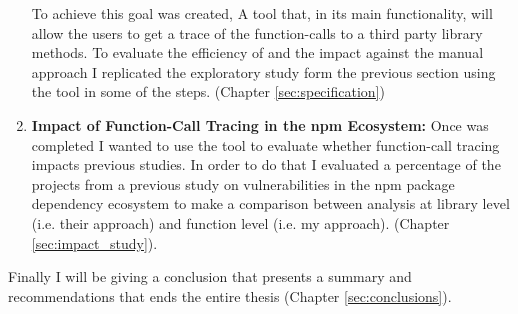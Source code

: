 \begin{enumerate}
    To achieve this goal \tool[] was created,
    A tool that, in its main functionality, will allow the users to get a trace of the function-calls to a third party library methods.
    To evaluate the efficiency of \tool[] and the impact against the manual approach I replicated the exploratory study form the previous section using the tool in some of the steps.
    (Chapter \ref{sec:specification})
    \item \textbf{Impact of Function-Call Tracing in the npm Ecosystem:} Once \tool[] was completed I wanted to use the tool to evaluate whether function-call tracing impacts previous studies.
    In order to do that I evaluated a percentage of the projects from a previous study on vulnerabilities in the npm package dependency ecosystem \cite{decan2018impact} to make a comparison between analysis at library level (i.e. their approach) and function level (i.e. my approach).
    (Chapter \ref{sec:impact_study}).
\end{enumerate}


Finally I will be giving a conclusion that presents a summary and recommendations that ends the entire thesis (Chapter \ref{sec:conclusions}).
